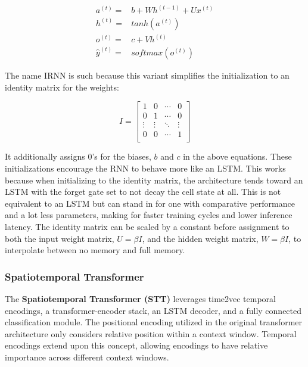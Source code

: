 \documentclass[10pt,twocolumn,letterpaper]{article}
\begin{document}
    \begin{align}
        a^{(t)} =& b + W h^{(t-1)} + U x^{(t)} \\
        h^{(t)} =& tanh(a^{(t)}) \\
        o^{(t)} =& c + V h^{(t)} \\
        \hat{y}^{(t)} =& softmax(o^{(t)})
    \end{align}

    The name IRNN is such because this variant simplifies the initialization to an identity matrix for the weights: 

    \begin{equation}
        \renewcommand\arraystretch{2}
        I = \begin{bmatrix}
            1 & 0 & \cdots & 0 \\
            0 & 1 & \cdots & 0 \\
            \vdots & \vdots & \ddots & \vdots \\
            0 & 0 & \cdots & 1 \\
        \end{bmatrix}
    \end{equation}

    It additionally assigns 0’s for the biases, $b$ and $c$ in the above equations. These initializations encourage the RNN to behave more like an LSTM. This works because when initializing to the identity matrix, the architecture tends toward an LSTM with the forget gate set to not decay the cell state at all. This is not equivalent to an LSTM but can stand in for one with comparative performance and a lot less parameters, making for faster training cycles and lower inference latency. The identity matrix can be scaled by a constant before assignment to both the input weight matrix, $U = \beta I$, and the hidden weight matrix, $W= \beta I$, to interpolate between no memory and full memory.

    \subsubsection{Spatiotemporal Transformer}

    The \textbf{Spatiotemporal Transformer (STT)} leverages time2vec temporal encodings, a transformer-encoder stack, an LSTM decoder, and a fully connected classification module. The positional encoding utilized in the original transformer architecture only considers relative position within a context window. Temporal encodings extend upon this concept, allowing encodings to have relative importance across different context windows\cite{STT_Paper,time2vec,STLAT_sota,vaswani_attention_2023,BERT}.
\end{document}
